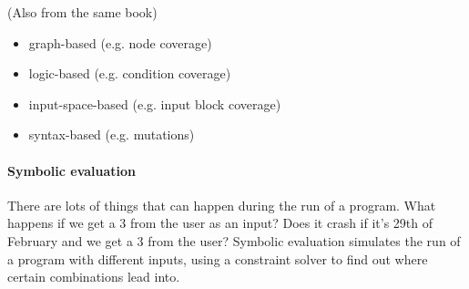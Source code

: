 (Also from the same book)

\begin{itemize}
\item graph-based (e.g. node coverage)
\item logic-based (e.g. condition coverage)
\item input-space-based (e.g. input block coverage)
\item syntax-based (e.g. mutations)
\end{itemize}


\paragraph{Symbolic evaluation }

There are lots of things that can happen during the run of a
program. What happens if we get a 3 from the user as an input? Does it
crash if it's 29th of February and we get a 3 from the user?  Symbolic 
evaluation simulates the run of a program with different inputs, using 
a constraint solver to find out where certain combinations lead into.



